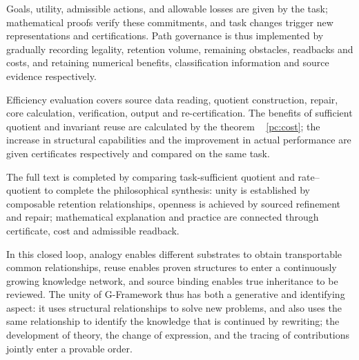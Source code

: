 \documentclass[11pt,a4paper]{article}
\theoremstyle{plain}
\theoremstyle{definition}
\theoremstyle{remark}
\begin{document}
\begin{CJK*}
Goals, utility, admissible actions, and allowable losses are given by the task; mathematical proofs verify these commitments, and task changes trigger new representations and certifications. Path governance is thus implemented by gradually recording legality, retention volume, remaining obstacles, readbacks and costs, and retaining numerical benefits, classification information and source evidence respectively.

Efficiency evaluation covers source data reading, quotient construction, repair, core calculation, verification, output and re-certification. The benefits of sufficient quotient and invariant reuse are calculated by the theorem ~ \ref{pc:cost}; the increase in structural capabilities and the improvement in actual performance are given certificates respectively and compared on the same task.

The full text is completed by comparing task-sufficient quotient and rate--quotient to complete the philosophical synthesis: unity is established by composable retention relationships, openness is achieved by sourced refinement and repair; mathematical explanation and practice are connected through certificate, cost and admissible readback.

In this closed loop, analogy enables different substrates to obtain transportable common relationships, reuse enables proven structures to enter a continuously growing knowledge network, and source binding enables true inheritance to be reviewed. The unity of G-Framework thus has both a generative and identifying aspect: it uses structural relationships to solve new problems, and also uses the same relationship to identify the knowledge that is continued by rewriting; the development of theory, the change of expression, and the tracing of contributions jointly enter a provable order.


\end{CJK*}
\end{document}
